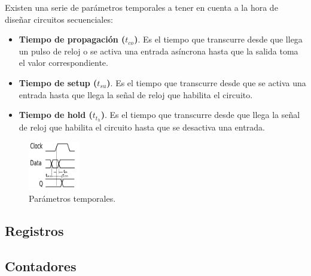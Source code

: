 \documentclass[a4paper, 11pt, titlepage]{article}
\begin{document}
			Existen una serie de parámetros temporales a tener en cuenta a la hora de diseñar 
			circuitos secuenciales:

			\begin{itemize}
				\item \textbf{Tiempo de propagación ($t_{co}$)}. Es el tiempo que transcurre
				desde que llega un pulso de reloj o se activa una entrada asíncrona hasta que 
				la salida toma el valor correspondiente.
				\item \textbf{Tiempo de setup ($t_{su}$)}. Es el tiempo que transcurre desde que 
				se activa una entrada hasta que llega la señal de reloj que habilita el circuito.
				\item \textbf{Tiempo de hold ($t_{t_h}$)}. Es el tiempo que transcurre desde que 
				llega la señal de reloj que habilita el circuito hasta que se desactiva una entrada.
			\end{itemize}

			\begin{figure}[htp]
				\centering
				\includegraphics[width=0.2\textwidth]{resources/partemp.png}
				\caption{Parámetros temporales.}
				\label{partemp}
			\end{figure}

	\subsection{Registros}

	\subsection{Contadores}
\end{document}
